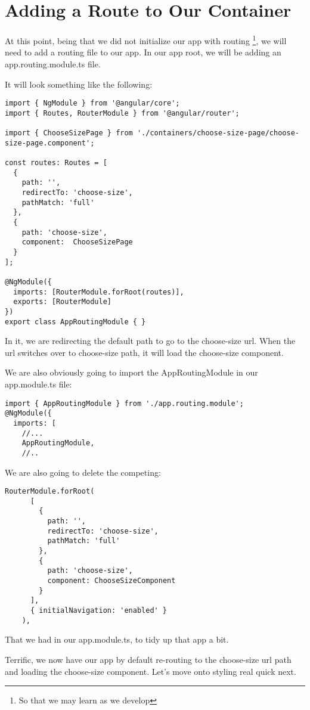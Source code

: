 \maketitle{}
\section{ Adding a Route to Our Container }

At this point, being that we did not initialize our app with routing
\footnote{So that we may learn as we develop}, we will need to add a routing
file to our app. In our app root, we will be adding an app.routing.module.ts
file.

It will look something like the following:
\begin{lstlisting}[caption=app.routing.module.ts file]
import { NgModule } from '@angular/core';
import { Routes, RouterModule } from '@angular/router';

import { ChooseSizePage } from './containers/choose-size-page/choose-size-page.component';

const routes: Routes = [
  {
    path: '',
    redirectTo: 'choose-size',
    pathMatch: 'full'
  },
  {
    path: 'choose-size',
    component:  ChooseSizePage
  }
];

@NgModule({
  imports: [RouterModule.forRoot(routes)],
  exports: [RouterModule]
})
export class AppRoutingModule { }
\end{lstlisting}

In it, we are redirecting the default path to go to the choose-size url. When
the url switches over to choose-size path, it will load the choose-size component.

We are also obviously going to import the AppRoutingModule in our app.module.ts
file:
\begin{lstlisting}[caption=app.module.ts file]
import { AppRoutingModule } from './app.routing.module';
@NgModule({
  imports: [
    //...
    AppRoutingModule,
    //..
\end{lstlisting}

We are also going to delete the competing:
\begin{lstlisting}[caption=app.module.ts file]
    RouterModule.forRoot(
      [
        {
          path: '',
          redirectTo: 'choose-size',
          pathMatch: 'full'
        },
        {
          path: 'choose-size',
          component: ChooseSizeComponent
        }
      ],
      { initialNavigation: 'enabled' }
    ),
\end{lstlisting}

That we had in our app.module.ts, to tidy up that app a bit.

Terrific, we now have our app by default re-routing to the choose-size url path
and loading the choose-size component. Let's move onto styling real quick next.
